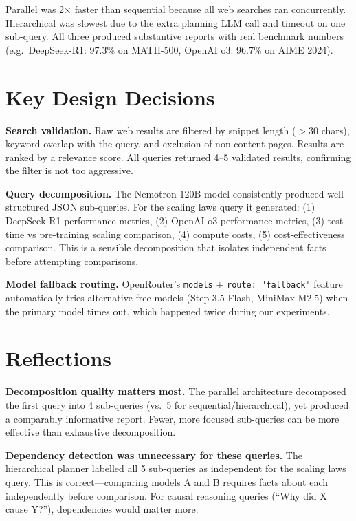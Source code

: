 \documentclass[11pt,a4paper]{article}
\begin{document}
Parallel was 2$\times$ faster than sequential because all web searches ran concurrently. Hierarchical was slowest due to the extra planning LLM call and timeout on one sub-query. All three produced substantive reports with real benchmark numbers (e.g.\ DeepSeek-R1: 97.3\% on MATH-500, OpenAI o3: 96.7\% on AIME 2024).

\section{Key Design Decisions}

\textbf{Search validation.} Raw web results are filtered by snippet length ($>$30 chars), keyword overlap with the query, and exclusion of non-content pages. Results are ranked by a relevance score. All queries returned 4--5 validated results, confirming the filter is not too aggressive.

\textbf{Query decomposition.} The Nemotron 120B model consistently produced well-structured JSON sub-queries. For the scaling laws query it generated: (1) DeepSeek-R1 performance metrics, (2) OpenAI o3 performance metrics, (3) test-time vs pre-training scaling comparison, (4) compute costs, (5) cost-effectiveness comparison. This is a sensible decomposition that isolates independent facts before attempting comparisons.

\textbf{Model fallback routing.} OpenRouter's \texttt{models} + \texttt{route: "fallback"} feature automatically tries alternative free models (Step 3.5 Flash, MiniMax M2.5) when the primary model times out, which happened twice during our experiments.

\section{Reflections}

\textbf{Decomposition quality matters most.} The parallel architecture decomposed the first query into 4 sub-queries (vs.\ 5 for sequential/hierarchical), yet produced a comparably informative report. Fewer, more focused sub-queries can be more effective than exhaustive decomposition.

\textbf{Dependency detection was unnecessary for these queries.} The hierarchical planner labelled all 5 sub-queries as independent for the scaling laws query. This is correct---comparing models A and B requires facts about each independently before comparison. For causal reasoning queries (``Why did X cause Y?''), dependencies would matter more.
\end{document}
